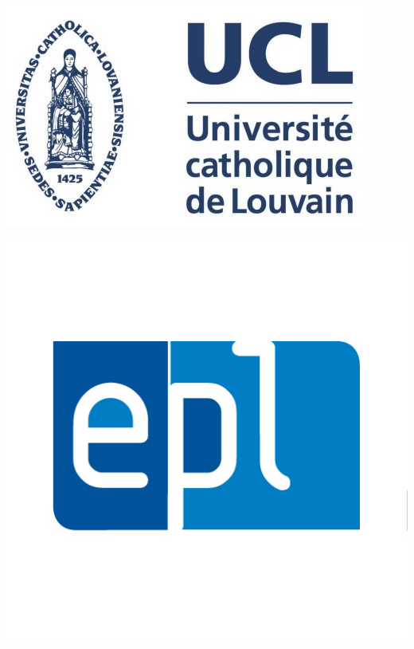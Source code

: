 \begin{titlepage}
\centering
\begin{minipage}{0.2\linewidth}
	\includegraphics[scale=0.2]{images/logo_ucl.jpg}
\end{minipage} \hspace{-10pt}
\begin{minipage}{0.2\linewidth}
\centering
    \includegraphics[scale=0.2]{images/logo_epl.jpg}
\end{minipage}
\end{titlepage}
\restoregeometry
